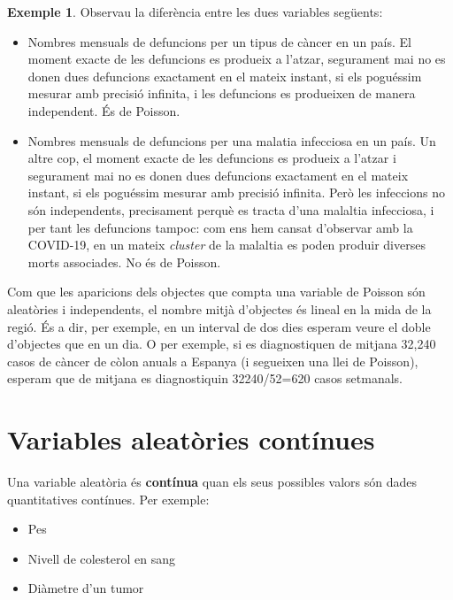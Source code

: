 \documentclass[
]{book}
\providecommand{\tightlist}{%
  \setlength{\itemsep}{0pt}\setlength{\parskip}{0pt}}
\newenvironment{rmdblock}[1]
  {
  \begin{itemize}
  \renewcommand{\labelitemi}{
    \raisebox{-.7\height}[0pt][0pt]{
      {\setkeys{Gin}{width=3em,keepaspectratio}\texttt{[image: Bioestadística-II\_files/figure-html/\#1]}}
    }
  }
  \setlength{\fboxsep}{1em}
  \begin{kframe}
  \item
  }
  {
  \end{kframe}
  \end{itemize}
  }
\newenvironment{rmdnote}
  {\begin{rmdblock}{note}}
  {\end{rmdblock}}
\theoremstyle{definition}
\theoremstyle{definition}
\newtheorem{example}{Exemple}[chapter]
\theoremstyle{definition}
\theoremstyle{remark}
\begin{document}
\begin{example}
\protect\hypertarget{exm:unnamed-chunk-52}{}{\label{exm:unnamed-chunk-52} }Observau la diferència entre les dues variables següents:

\begin{itemize}
\item
  Nombres mensuals de defuncions per un tipus de càncer en un país. El moment exacte de les defuncions es produeix a l'atzar, segurament mai no es donen dues defuncions exactament en el mateix instant, si els poguéssim mesurar amb precisió infinita, i les defuncions es produeixen de manera independent. És de Poisson.
\item
  Nombres mensuals de defuncions per una malatia infecciosa en un país. Un altre cop, el moment exacte de les defuncions es produeix a l'atzar i segurament mai no es donen dues defuncions exactament en el mateix instant, si els poguéssim mesurar amb precisió infinita. Però les infeccions no són independents, precisament perquè es tracta d'una malaltia infecciosa, i per tant les defuncions tampoc: com ens hem cansat d'observar amb la COVID-19, en un mateix \emph{cluster} de la malaltia es poden produir diverses morts associades. No és de Poisson.
\end{itemize}
\end{example}

\begin{rmdnote}
Com que les aparicions dels objectes que compta una variable de Poisson són aleatòries i independents, el nombre mitjà d'objectes és lineal en la mida de la regió. És a dir, per exemple, en un interval de dos dies esperam veure el doble d'objectes que en un dia. O per exemple, si es diagnostiquen de mitjana 32,240 casos de càncer de còlon anuals a Espanya (i segueixen una llei de Poisson), esperam que de mitjana es diagnostiquin 32240/52=620 casos setmanals.
\end{rmdnote}

\hypertarget{variables-aleatuxf2ries-contuxednues}{%
\section{Variables aleatòries contínues}\label{variables-aleatuxf2ries-contuxednues}}

Una variable aleatòria és \textbf{contínua} quan els seus possibles valors són dades quantitatives contínues. Per exemple:

\begin{itemize}
\tightlist
\item
  Pes
\item
  Nivell de colesterol en sang
\item
  Diàmetre d'un tumor
\end{itemize}
\end{document}
